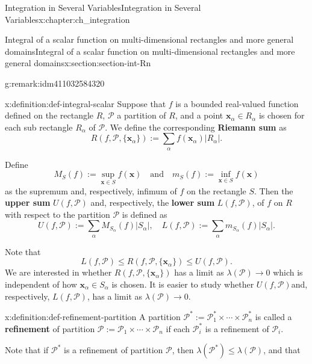 \documentclass[oneside,10pt,]{book}
\newcommand{\terminology}[1]{\textbf{#1}}
\newcommand{\bx}{\mathbf{x}}
\newcommand{\cP}{\mathcal{P}}
\begin{document}
\begin{chapterptx}{Integration in Several Variables}{}{Integration in Several Variables}{}{}{x:chapter:ch_integration}
\begin{sectionptx}{Integral of a scalar function on multi-dimensional rectangles and more general domains}{}{Integral of a scalar function on multi-dimensional rectangles and more general domains}{}{}{x:section:section-int-Rn}
\begin{remark}{}{g:remark:idm411032584320}
\end{remark}
\begin{definition}{}{x:definition:def-integral-scalar}%
%
%
%
%
\label{g:notation:idm411032551472}%
Suppose that \(f\) is a bounded real-valued function defined on the rectangle \(R\), \(\cP\) a partition of \(R\), and a point \(\bx_{\alpha}\in R_{\alpha}\) is chosen for each sub rectangle \(R_{\alpha}\) of \(\cP\). We define the corresponding \terminology{Riemann sum} as%
\begin{equation*}
R(f, \cP, \{\bx_{\alpha}\}):=\sum_{\alpha} f(\bx_{\alpha}) \vert R_{\alpha} \vert.
\end{equation*}
%
\par
Define%
\begin{equation*}
M_{S}(f):=\sup_{\bx\in S}f(\bx) \quad \text{and} \quad 
m_{S}(f):=\inf_{\bx\in S}f(\bx) 
\end{equation*}
as the supremum and, respectively, infimum of \(f\) on the rectangle \(S\). Then the \terminology{upper sum} \(U(f, \cP)\) and, respectively, the \terminology{lower sum} \(L(f, \cP)\), of \(f\) on \(R\) with respect to the partition \(\cP\) is defined as%
\begin{equation*}
U(f, \cP) :=\sum_{\alpha} M_{S_{\alpha}}(f) \vert S_{\alpha}\vert,
\quad
L(f, \cP) :=\sum_{\alpha} m_{S_{\alpha}}(f) \vert S_{\alpha}\vert.
\end{equation*}
%
\end{definition}
Note that%
\begin{equation*}
L(f, \cP)\le R(f, \cP, \{\bx_{\alpha}\})\le U(f, \cP).
\end{equation*}
We are interested in whether \(R(f, \cP, \{\bx_{\alpha}\})\) has a limit as \(\lambda (\cP)\to 0\) which is independent of how \(\bx_{\alpha}\in S_{\alpha}\) is chosen. It is easier to study whether \(U(f, \cP)\)and, respectively, \(L(f, \cP)\), has a limit as \(\lambda (\cP)\to 0\).%
\begin{definition}{}{x:definition:def-refinement-partition}%
%
A partition \(\cP^{*}:=\cP^{*}_{1}\times\cdots \times \cP^{*}_{n}\) is called a \terminology{refinement} of partition \(\cP:=\cP_{1}\times\cdots \times \cP_{n}\) if each \(\cP^{*}_{i}\) is a refinement of \(\cP_{i}\).\end{definition}
Note that if \(\cP^{*}\) is a refinement of partition \(\cP\), then \(\lambda(\cP^{*})\le \lambda(\cP)\), and that%
\begin{equation*}

\end{equation*}
\end{sectionptx}
\end{chapterptx}
\end{document}

